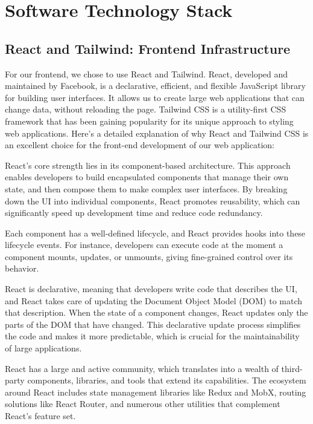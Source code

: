 \section{Software Technology Stack}
\label{sec:technology}

\subsection{React and Tailwind: Frontend Infrastructure}
For our frontend, we chose to use React and Tailwind. React, developed and maintained by Facebook, is a declarative, efficient, and flexible JavaScript library for building user interfaces. 
It allows us to create large web applications that can change data, without reloading the page. 
Tailwind CSS is a utility-first CSS framework that has been gaining popularity for its unique approach to styling web applications. 
Here's a detailed explanation of why React and Tailwind CSS is an excellent choice for the front-end development of our web application:

React's core strength lies in its component-based architecture. This approach enables developers to build encapsulated components that manage their own state, and then compose them to make complex user interfaces. 
By breaking down the UI into individual components, React promotes reusability, which can significantly speed up development time and reduce code redundancy.

Each component has a well-defined lifecycle, and React provides hooks into these lifecycle events. 
For instance, developers can execute code at the moment a component mounts, updates, or unmounts, giving fine-grained control over its behavior.

React is declarative, meaning that developers write code that describes the UI, and React takes care of updating the Document Object Model (DOM) to match that description. 
When the state of a component changes, React updates only the parts of the DOM that have changed. 
This declarative update process simplifies the code and makes it more predictable, which is crucial for the maintainability of large applications.

React has a large and active community, which translates into a wealth of third-party components, libraries, and tools that extend its capabilities. 
The ecosystem around React includes state management libraries like Redux and MobX, routing solutions like React Router, and numerous other utilities that complement React's feature set.

